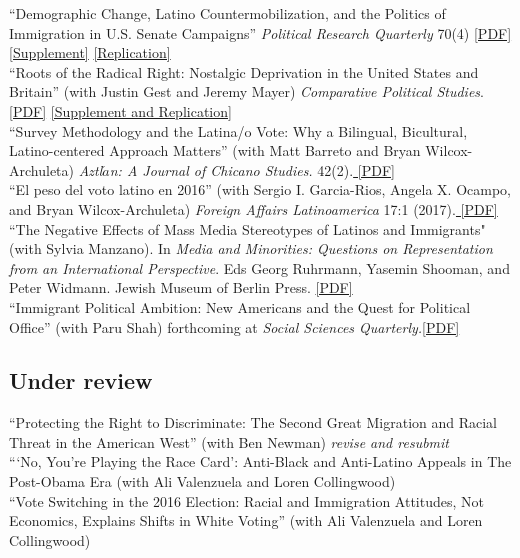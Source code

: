 \documentclass[11pt, a4paper]{article}
\newcommand{\years}[1]{\marginnote{\scriptsize #1}}
\begin{document}
\years{2017}``Demographic Change, Latino Countermobilization, and the Politics of Immigration in U.S. Senate Campaigns'' \textit{Political Research Quarterly} 70(4) \href{http://tylerreny.github.io/pdf/pubs/reny_2017_prq_final.pdf}{[PDF]} \href{http://tylerreny.github.io/pdf/pubs/reny_2017_prq_final_supp.pdf}{[Supplement]} \href{https://github.com/tylerreny/tylerreny.github.io/tree/master/replication/PRQ_2017}{[Replication]} \\
\years{2017}``Roots of the Radical Right: Nostalgic Deprivation in the United States and Britain'' (with Justin Gest and Jeremy Mayer) \textit{Comparative Political Studies}. \href{http://tylerreny.github.io/pdf/pubs/reny_2017_cps_final.pdf}{[PDF]} \href{https://github.com/tylerreny/tylerreny.github.io/tree/master/replication/CPS_2017}{[Supplement and Replication]}\\
\years{2017} ``Survey Methodology and the Latina/o Vote: Why a Bilingual, Bicultural, Latino-centered Approach Matters'' (with Matt Barreto and Bryan Wilcox-Archuleta) \textit{Aztl$\acute{a}$n: A Journal of Chicano Studies.} 42(2).\href{http://tylerreny.github.io/pdf/pubs/reny_2017_aztlan_final.pdf}{ [PDF]}\\
\years{2017} ``El peso del voto latino en 2016'' (with Sergio I. Garcia-Rios, Angela X. Ocampo, and Bryan Wilcox-Archuleta) \textit{Foreign Affairs Latinoamerica} 17:1 (2017).\href{http://tylerreny.github.io/pdf/pubs/reny_et_al_2017_foreign_affairs.pdf}{ [PDF]}\\
\years{2016} ``The Negative Effects of Mass Media Stereotypes of Latinos and Immigrants" (with Sylvia Manzano). In \textit{Media and Minorities: Questions on Representation from an International Perspective}. Eds Georg Ruhrmann, Yasemin Shooman, and Peter Widmann. Jewish Museum of Berlin Press. \href{http://tylerreny.github.io/pdf/pubs/reny_manzano_stereotypes_2016.pdf}{[PDF]}\\
\years{2016} ``Immigrant Political Ambition:  New Americans and the Quest for Political Office'' (with Paru Shah) forthcoming at \textit{Social Sciences Quarterly.}\href{http://tylerreny.github.io/pdf/pubs/reny_shah_2018_ssq_immigrant_ambition.pdf}{[PDF]}\\


\subsection*{Under review}

\years{}``Protecting the Right to Discriminate: The Second Great Migration and Racial Threat in the American West'' (with Ben Newman) \textit{revise and resubmit}\\
\years{}```No, You’re Playing the Race Card': Anti-Black and Anti-Latino Appeals in The Post-Obama Era (with Ali Valenzuela and Loren Collingwood)\\
\years{}``Vote Switching in the 2016 Election: Racial and Immigration Attitudes, Not Economics, Explains Shifts in White Voting'' (with Ali Valenzuela and Loren Collingwood)\\
\end{document}
